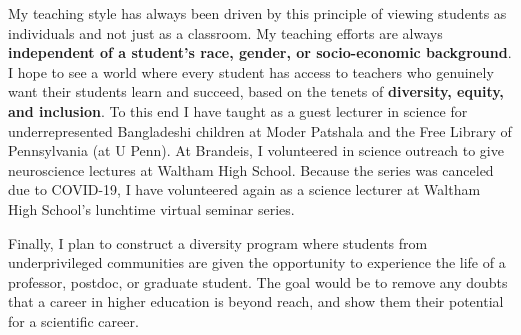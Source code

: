 \documentclass[a4paper,11pt]{article}
\begin{document}
My teaching style has always been driven by this principle of viewing students as individuals and not just as a classroom. My teaching efforts are always \textbf{independent of a student's race, gender, or socio-economic background}. I hope to see a world where every student has access to teachers who genuinely want their students learn and succeed, based on the tenets of \textbf{diversity, equity, and inclusion}. To this end I have taught as a guest lecturer in science for underrepresented Bangladeshi children at Moder Patshala and the Free Library of Pennsylvania (at U Penn). At Brandeis, I volunteered in science outreach to give neuroscience lectures at Waltham High School. Because the series was canceled due to COVID-19, I have volunteered again as a science lecturer at Waltham High School's lunchtime virtual seminar series.

Finally, I plan to construct a diversity program where students from underprivileged communities are given the opportunity to experience the life of a professor, postdoc, or graduate student. The goal would be to remove any doubts that a career in higher education is beyond reach, and show them their potential for a scientific career.




\end{document}
